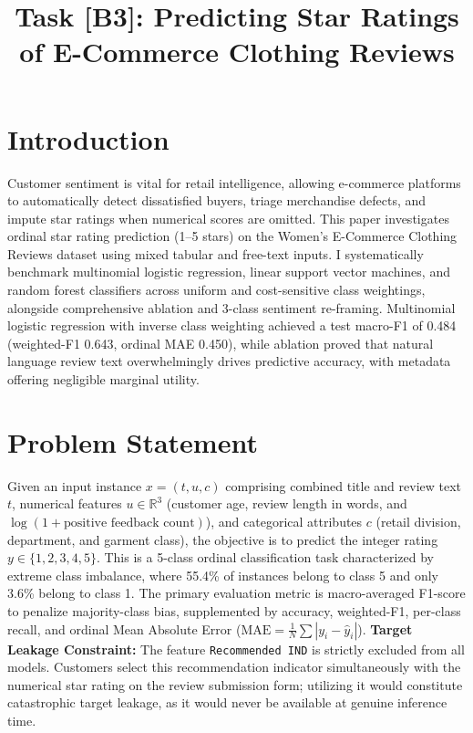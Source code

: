 \documentclass[conference,10pt,a4paper]{IEEEtran}
\begin{document}
\title{Task [B3]: Predicting Star Ratings of E-Commerce Clothing Reviews}
\author{
}
\maketitle

\section{Introduction}
Customer sentiment is vital for retail intelligence, allowing e-commerce platforms to automatically detect dissatisfied buyers, triage merchandise defects, and impute star ratings when numerical scores are omitted. This paper investigates ordinal star rating prediction (1--5 stars) on the Women's E-Commerce Clothing Reviews dataset using mixed tabular and free-text inputs. I systematically benchmark multinomial logistic regression, linear support vector machines, and random forest classifiers across uniform and cost-sensitive class weightings, alongside comprehensive ablation and 3-class sentiment re-framing. Multinomial logistic regression with inverse class weighting achieved a test macro-F1 of 0.484 (weighted-F1 0.643, ordinal MAE 0.450), while ablation proved that natural language review text overwhelmingly drives predictive accuracy, with metadata offering negligible marginal utility.

\section{Problem Statement}
Given an input instance $x = (t, u, c)$ comprising combined title and review text $t$, numerical features $u \in \mathbb{R}^3$ (customer age, review length in words, and $\log(1 + \text{positive feedback count})$), and categorical attributes $c$ (retail division, department, and garment class), the objective is to predict the integer rating $y \in \{1, 2, 3, 4, 5\}$. This is a 5-class ordinal classification task characterized by extreme class imbalance, where 55.4\% of instances belong to class 5 and only 3.6\% belong to class 1. The primary evaluation metric is macro-averaged F1-score to penalize majority-class bias, supplemented by accuracy, weighted-F1, per-class recall, and ordinal Mean Absolute Error ($\text{MAE} = \frac{1}{N}\sum |y_i - \hat{y}_i|$). 
\textbf{Target Leakage Constraint:} The feature \texttt{Recommended IND} is strictly excluded from all models. Customers select this recommendation indicator simultaneously with the numerical star rating on the review submission form; utilizing it would constitute catastrophic target leakage, as it would never be available at genuine inference time.
\end{document}
